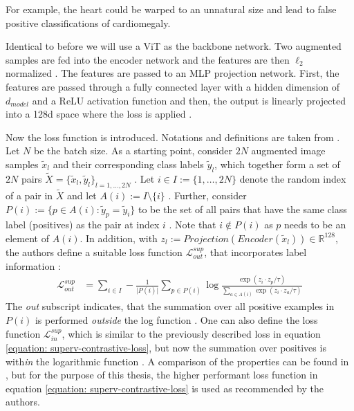 For example, the heart could be warped to an unnatural size and lead to false positive classifications of cardiomegaly.
\par
Identical to before we will use a ViT as the backbone network.
Two augmented samples are fed into the encoder network and the features are then $\ell_2$ normalized \citep{Khosla2020}.
The features are passed to an MLP projection network.
First, the features are passed through a fully connected layer with a hidden dimension of $d_{model}$ and a ReLU activation function and then, the output is linearly projected into a 128d space where the loss is applied \citep{Khosla2020}.
\par
Now the loss function is introduced.
Notations and definitions are taken from \citep{Khosla2020}.
Let $N$ be the batch size.
As a starting point, consider $2N$ augmented image samples $\tilde{x}_l$ and their corresponding class labels $\tilde{y}_l$, which together form a set of $2N$ pairs $\tilde{X} = \{\tilde{x}_l, \tilde{y}_l\}_{l=1,\dots,2N}$ \citep{Khosla2020}.
Let $i \in I:=\{1,\dots,2N\}$ denote the random index of a pair in $\tilde{X}$ and let $A(i):=I\setminus \{i\}$ \citep{Khosla2020}.
Further, consider $P(i):=\{p\in A(i): \tilde{y}_p = \tilde{y}_i\}$ to be the set of all pairs that have the same class label (positives) as the pair at index $i$ \citep{Khosla2020}.
Note that $i \not \in P(i)$ as $p$ needs to be an element of $A(i)$.   
In addition, with $z_{l} := Projection(Encoder(\tilde{x}_l)) \in \mathbb{R}^{128}$, the authors define a suitable loss function $\mathcal{L}_{out}^{sup}$, that incorporates label information \citep{Khosla2020}:
\begin{align}
	\mathcal{L}_{out}^{sup} &= \sum_{i\in I} -\frac{1}{\vert P(i) \vert} \sum_{p\in P(i)} \log \frac{\exp(z_i \cdot z_p/\tau)}{\sum_{a \in A(i)}\exp(z_i \cdot z_a/\tau)}
	\label{equation: superv-contrastive-loss}
\end{align}
The \textit{out} subscript indicates, that the summation over all positive examples in $P(i)$ is performed \textit{outside} the log function \citep{Khosla2020}.
One can also define the loss function $\mathcal{L}_{in}^{sup}$, which is similar to the previously described loss in equation \ref{equation: superv-contrastive-loss}, but now the summation over positives is with\textit{in} the logarithmic function \citep{Khosla2020}.
A comparison of the properties can be found in \citep{Khosla2020}, but for the purpose of this thesis, the higher performant loss function in equation \ref{equation: superv-contrastive-loss} is used as recommended by the authors.


